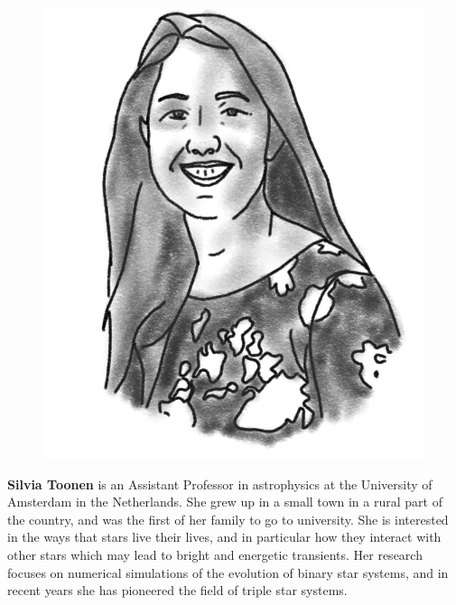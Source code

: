 \begin{figure}
\vspace{15pt}
\includegraphics[width=0.9\linewidth]{portraits/silvia.png}
\end{figure}
\textbf{Silvia Toonen} is an Assistant Professor in astrophysics at the University of Amsterdam in the Netherlands. She grew up in a small town in a rural part of the country, and was the first of her family to go to university. She is interested in the ways that stars live their lives, and in particular how they interact with other stars which may lead to bright and energetic transients. Her research focuses on numerical simulations of the evolution of binary star systems, and in recent years she has pioneered the field of triple star systems.\\
\\

